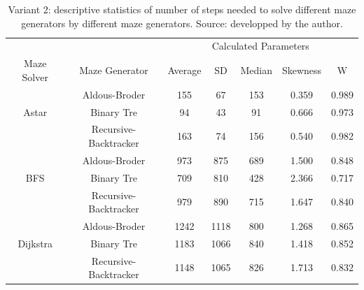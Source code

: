 \begin{table}[!ht]
    \centering
    \caption{Variant 2: descriptive statistics of number of steps needed to solve different maze generators by different maze generators. Source: developped by the author.}
    \begin{tabular}{c c c c c c c}
    \hline
        ~&~&\multicolumn{5}{c}{Calculated Parameters}\\
        Maze Solver & Maze Generator & Average & SD & Median & Skewness & W\\ \hline \hline
        ~ & Aldous-Broder & 155 & 67 & 153 & 0.359 & 0.989\\ 
        Astar & Binary Tre & 94 & 43 & 91 & 0.666 & 0.973 \\ 
        ~ & Recursive-Backtracker & 163 & 74 & 156 & 0.540 & 0.982\\ \hline
        ~ & Aldous-Broder & 973 & 875 & 689 & 1.500 & 0.848 \\ 
        BFS & Binary Tre & 709 & 810 & 428 & 2.366 & 0.717 \\ 
        ~ & Recursive-Backtracker & 979 & 890 & 715 & 1.647 & 0.840 \\ \hline
        ~ & Aldous-Broder & 1242 & 1118 & 800 & 1.268 & 0.865\\ 
        Dijkstra & Binary Tre & 1183 & 1066 & 840 & 1.418 & 0.852\\ 
        ~ & Recursive-Backtracker & 1148 & 1065 & 826 & 1.713 & 0.832\\ \hline
    \end{tabular}
\end{table}    
\newpage  
